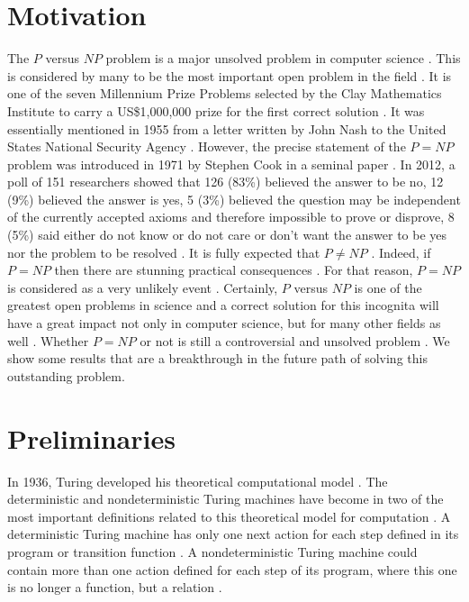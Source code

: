 \documentclass[a4paper,UKenglish,cleveref, autoref]{lipics-v2019}
\begin{document}
\section{Motivation}

The $P$ versus $NP$ problem is a major unsolved problem in computer science \cite{CS00}. This is considered by many to be the most important open problem in the field \cite{CS00}. It is one of the seven Millennium Prize Problems selected by the Clay Mathematics Institute to carry a US\$1,000,000 prize for the first correct solution \cite{CS00}. It was essentially mentioned in 1955 from a letter written by John Nash to the United States National Security Agency \cite{AS17}. However, the precise statement of the $P=NP$ problem was introduced in 1971 by Stephen Cook in a seminal paper \cite{CS00}. In 2012, a poll of 151 researchers showed that 126 (83\%) believed the answer to be no, 12 (9\%) believed the answer is yes, 5 (3\%) believed the question may be independent of the currently accepted axioms and therefore impossible to prove or disprove, 8 (5\%) said either do not know or do not care or don't want the answer to be yes nor the problem to be resolved \cite{GA12}. It is fully expected that $P \neq NP$ \cite{Pap03}. Indeed, if $P = NP$ then there are stunning practical consequences \cite{Pap03}. For that reason, $P = NP$ is considered as a very unlikely event \cite{Pap03}. Certainly, $P$ versus $NP$ is one of the greatest open problems in science and a correct solution for this incognita will have a great impact not only in computer science, but for many other fields as well \cite{AS17}. Whether $P = NP$ or not is still a controversial and unsolved problem \cite{AS17}. We show some results that are a breakthrough in the future path of solving this outstanding problem.

\section{Preliminaries}

In 1936, Turing developed his theoretical computational model \cite{MS06}. The deterministic and nondeterministic Turing machines have become in two of the most important definitions related to this theoretical model for computation \cite{MS06}. A deterministic Turing machine has only one next action for each step defined in its program or transition function \cite{MS06}. A nondeterministic Turing machine could contain more than one action defined for each step of its program, where this one is no longer a function, but a relation \cite{MS06}.
\end{document}

